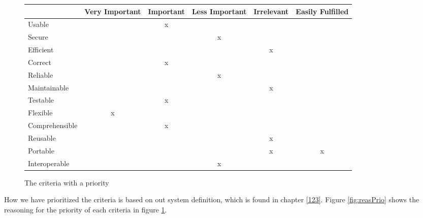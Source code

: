 \begin{figure}[htbp]
	\centering
		\begin{tabular}{| l | m{} | m{}| m{}| m{}|m{}|} \hline
		  & Very  Important & Important & Less Important & Irrelevant & Easily Fulfilled \\ \hline
		Usable  & & \multicolumn{1}{c|}{x} & & & \\ \hline
		Secure  & & & \multicolumn{1}{c|}{x} & & \\ \hline
		Efficient & & & & \multicolumn{1}{c|}{x} & \\ \hline
		Correct  & & \multicolumn{1}{c|}{x} & & & \\ \hline
		Reliable  & & & \multicolumn{1}{c|}{x} & & \\ \hline
		Maintainable  & & & & \multicolumn{1}{c|}{x} & \\ \hline
		Testable  & & \multicolumn{1}{c|}{x} & & & \\ \hline
		Flexible  & \multicolumn{1}{c|}{x} & & & & \\ \hline
		Comprehensible  & & \multicolumn{1}{c|}{x} & & & \\ \hline
		Reusable  & & & & \multicolumn{1}{c|}{x} & \\ \hline
		Portable & & & & \multicolumn{1}{c|}{x} & \multicolumn{1}{c|}{x} \\ \hline
		Interoperable & & & \multicolumn{1}{c|}{x} & & \\ \hline
		\end{tabular}
	\caption{The criteria with a priority}
	\label{fig:prioritizedCrit}
\end{figure}

How we have prioritized the criteria is based on out system definition, which is found in chapter \ref{123}. Figure \ref{fig:reasPrio} shows the reasoning for the priority of each criteria in figure \ref{fig:prioritizedCrit}.

